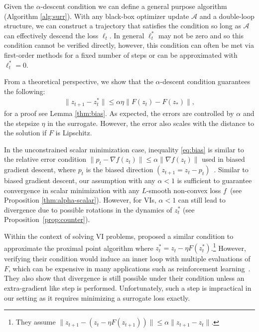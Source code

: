 \documentclass{article} %
\theoremstyle{definition}
\begin{document}
Given the $\alpha$-descent condition we can define a general purpose algorithm (Algorithm \ref{alg:surr}).
With any black-box optimizer update $\mathcal{A}$ and a double-loop structure, we can construct a trajectory that satisfies the condition so long as $\mathcal{A}$ can effectively descend the loss $\ell_t$.
In general $\ell_t^\ast$ may not be zero and so this condition cannot be verified directly, however, this condition can often be met via first-order methods for a fixed number of steps or can be approximated with $\ell_t^\ast =0$. 

From a theoretical perspective, we show that the $\alpha$-descent condition guarantees the following:
\begin{align}\label{eq:bias}
    \|z_{t+1} - z_t^\ast \| \leq \alpha \eta \|F(z_t)-F(z_\ast)\|, 
\end{align}
for a proof see Lemma \ref{thm:bias}.
As expected, the errors are controlled by $\alpha$ and the stepsize $\eta$ in the surrogate. However, the error also scales with the distance to the solution if $F$ is Lipschitz.


In the unconstrained scalar minimization case, inequality \eqref{eq:bias} is similar to the relative error condition $\|p_t - \nabla f(z_t)\| \leq \alpha\|\nabla f(z_t)\|$ used in biased gradient descent, where $p_t$ is the biased direction $(z_{t+1}= z_t -p_t)$~\citep{ajalloeian2020convergence,drusvyatskiy2023stochastic}.
Similar to biased gradient descent, our assumption with any $\alpha <1$ is sufficient to guarantee convergence in scalar minimization with any $L$-smooth  non-convex loss $f$~(see Proposition \ref{thm:alpha-scalar}).
However, for VIs, $\alpha <1$ can still lead to divergence due to possible rotations in the dynamics of $z_t^\ast$ (see Proposition~\ref{prop:counter}).

Within the context of solving VI problems,  \citet{solodov1999hybrid} proposed a similar condition to approximate the proximal point algorithm where $z_t^\ast = z_t - \eta F(z_t^\ast)$.\footnote{They assume $\|z_{t+1} -(z_t-\eta F(z_{t+1}))\| \leq \alpha \|z_{t+1}-z_t\|$.}
However, verifying their condition would  induce an inner loop with multiple evaluations of $F$, which can be expensive in many applications such as reinforcement learning~\citep{vaswani2021general}.
They also show that divergence is still possible under their condition unless an extra-gradient like step is performed.
Unfortunately, such a step is impractical in our setting as it requires minimizing a surrogate loss exactly. 
\end{document}
